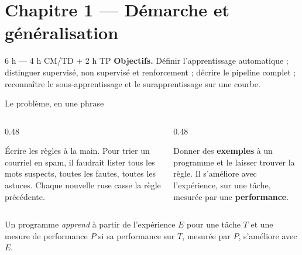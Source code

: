 \section{Chapitre 1 --- Démarche et généralisation}

%
{6 h --- 4 h CM/TD + 2 h TP}%
{\textbf{Objectifs.} Définir l'apprentissage automatique ; distinguer supervisé,
non supervisé et renforcement ; décrire le pipeline complet ; reconnaître le
sous-apprentissage et le surapprentissage sur une courbe.}

\begin{frame}{Le problème, en une phrase}
\begin{columns}[t]
\begin{column}{0.48\textwidth}
\begin{wbox}
Écrire les règles à la main. Pour trier un courriel en spam, il faudrait
lister tous les mots suspects, toutes les fautes, toutes les astuces.
Chaque nouvelle ruse casse la règle précédente.
\end{wbox}
\end{column}
\begin{column}{0.48\textwidth}
\begin{kbox}[Ce qu'on veut]
Donner des \textbf{exemples} à un programme et le laisser trouver la règle.
Il s'améliore avec l'expérience, sur une tâche, mesurée par une
\textbf{performance}.
\end{kbox}
\end{column}
\end{columns}
\vspace{2mm}
\begin{solbox}
Un programme \emph{apprend} à partir de l'expérience $E$ pour une tâche $T$ et
une mesure de performance $P$ si sa performance sur $T$, mesurée par $P$,
s'améliore avec $E$.
\end{solbox}
\end{frame}

